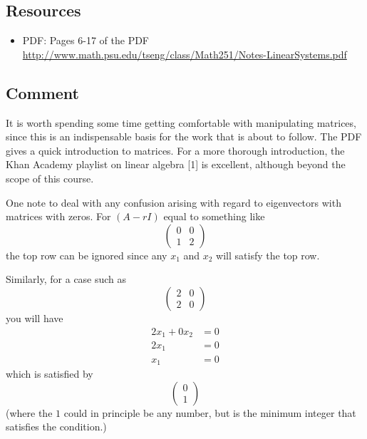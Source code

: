 \subsection*{Resources}
\begin{itemize}
    \item PDF: Pages 6-17 of the PDF \url{http://www.math.psu.edu/tseng/class/Math251/Notes-LinearSystems.pdf}
\end{itemize}

\subsection*{Comment}
It is worth spending some time getting comfortable with manipulating matrices, since this is an indispensable basis for the work that is about to follow. The PDF gives a quick introduction to matrices. For a more thorough introduction, the Khan Academy playlist on linear algebra [1] is excellent, although beyond the scope of this course.

One note to deal with any confusion arising with regard to eigenvectors with matrices with zeros. For $(A-rI)$ equal to something like
\begin{equation}
\left(
    \begin{array}{cc}
        0 & 0 \\
        1 & 2
    \end{array}
\right)
\end{equation}
the top row can be ignored since any $x_1$ and $x_2$ will satisfy the top row.

Similarly, for a case such as
\begin{equation}
\left(
    \begin{array}{cc}
        2 & 0 \\
        2 & 0
    \end{array}
\right)
\end{equation}
you will have
\begin{align}
    2 x_1 + 0 x_2 &= 0 \\
    2 x_1 &= 0 \\
    x_1 &= 0
\end{align}
which is satisfied by
\begin{equation}
\left(
    \begin{array}{c}
        0 \\
        1
    \end{array}
\right)
\end{equation}
(where the $1$ could in principle be any number, but is the minimum integer that satisfies the condition.)

